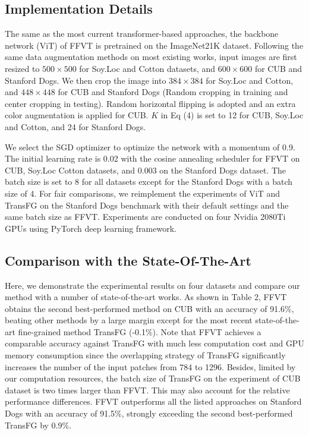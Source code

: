 \documentclass{bmvc2k}
\begin{document}
\subsection{Implementation Details}
The same as the most current transformer-based approaches, the backbone network (ViT) of FFVT is pretrained on the ImageNet21K dataset. Following the same data augmentation methods on most existing works, input images are first resized to $500 \times 500$ for Soy.Loc and Cotton datasets, and $600 \times 600$ for CUB and Stanford Dogs. We then crop the image into $384 \times 384$ for Soy.Loc and Cotton, and $448 \times 448$ for CUB and Stanford Dogs (Random cropping in training and center cropping in testing). Random horizontal flipping is adopted and an extra color augmentation is applied for CUB. $K$ in Eq (4) is set to 12 for CUB, Soy.Loc and Cotton, and 24 for Stanford Dogs. 
\par
We select the SGD optimizer to optimize the network with a momentum of 0.9. The initial learning rate is 0.02 with the cosine annealing scheduler for FFVT on CUB, Soy.Loc Cotton datasets, and 0.003 on the Stanford Dogs dataset. The batch size is set to 8 for all datasets except for the Stanford Dogs with a batch size of 4. For fair comparisons, we reimplement the experiments of ViT and TransFG on the Stanford Dogs benchmark with their default settings and the same batch size as FFVT. Experiments are conducted on four Nvidia 2080Ti GPUs using PyTorch deep learning framework.


\subsection{Comparison with the State-Of-The-Art}
Here, we demonstrate the experimental results on four datasets and compare our method with a number of state-of-the-art works. As shown in Table 2, FFVT obtains the second best-performed method on CUB with an accuracy of 91.6\%, beating other methods by a large margin except for the most recent state-of-the-art fine-grained method TransFG (-0.1\%). Note that FFVT achieves a comparable accuracy against TransFG with much less computation cost and GPU memory consumption since the overlapping strategy of TransFG significantly increases the number of the input patches from 784 to 1296. Besides, limited by our computation resources, the batch size of TransFG on the experiment of CUB dataset is two times larger than FFVT. This may also account for the relative performance differences. FFVT outperforms all the listed approaches on Stanford Dogs with an accuracy of 91.5\%, strongly exceeding the second best-performed TransFG by 0.9\%. 
\end{document}
